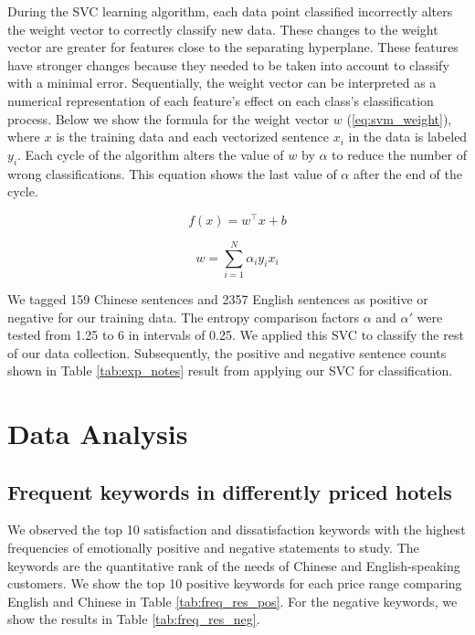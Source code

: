 \documentclass[smallextended,natbib]{svjour3}       %
\begin{document}
    During the SVC learning algorithm, each data point classified incorrectly alters the weight vector to correctly classify new data. These changes to the weight vector are greater for features close to the separating hyperplane. These features have stronger changes because they needed to be taken into account to classify with a minimal error. Sequentially, the weight vector can be interpreted as a numerical representation of each feature's effect on each class's classification process. Below we show the formula for the weight vector \(w\) (\ref{eq:svm_weight}), where \(x\) is the training data and each vectorized sentence \(x_i\) in the data is labeled \(y_i\). Each cycle of the algorithm alters the value of \(w\) by \(\alpha\) to reduce the number of wrong classifications. This equation shows the last value of \(\alpha\) after the end of the cycle.

    \begin{equation}\label{eq:svm1}
    f(x) = w^\top x + b
    \end{equation}

    \begin{equation}\label{eq:svm_weight}
    w = \sum_{i=1}^N \alpha_i y_i x_i
    \end{equation}

    We tagged 159 Chinese sentences and \num[group-separator={,}]{2357} English sentences as positive or negative for our training data. The entropy comparison factors \(\alpha\) and \(\alpha'\) were tested from 1.25 to 6 in intervals of 0.25. We applied this SVC to classify the rest of our data collection. Subsequently, the positive and negative sentence counts shown in Table \ref{tab:exp_notes} result from applying our SVC for classification.

\section{Data Analysis}\label{dataanalysis}

  \subsection{Frequent keywords in differently priced hotels}\label{svmresults}

    We observed the top 10 satisfaction and dissatisfaction keywords with the highest frequencies of emotionally positive and negative statements to study. The keywords are the quantitative rank of the needs of Chinese and English-speaking customers. We show the top 10 positive keywords for each price range comparing English and Chinese in Table \ref{tab:freq_res_pos}. For the negative keywords, we show the results in Table \ref{tab:freq_res_neg}.
\end{document}
